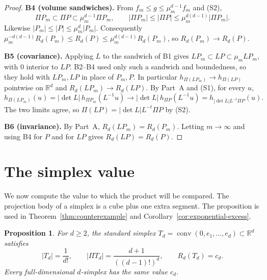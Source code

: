 \documentclass[11pt]{article}
\newtheorem{proposition}[theorem]{Proposition}
\newcommand{\R}{\mathbb R}
\DeclareMathOperator{\conv}{conv}
\newcommand{\step}[1]{\smallskip\noindent\textbf{#1}}
\begin{document}
\begin{proof}
\step{B4 (volume sandwiches).} From \(f_m\le g\le\mu_m^{d-1}f_m\) and (S2),
\[
 \Pi P_m\subset\Pi P\subset\mu_m^{d-1}\Pi P_m,
 \qquad
 |\Pi P_m|\le|\Pi P|\le\mu_m^{d(d-1)}|\Pi P_m|.
\]
Likewise \(|P_m|\le|P|\le\mu_m^d|P_m|\). Consequently
\(\mu_m^{-d(d-1)}R_d(P_m)\le R_d(P)\le\mu_m^{d(d-1)}R_d(P_m)\), so
\(R_d(P_m)\to R_d(P)\).

\step{B5 (covariance).} Applying \(L\) to the sandwich of B1 gives
\(LP_m\subset LP\subset\mu_mLP_m\), with \(0\) interior to \(LP\). B2--B4
used only such a sandwich and boundedness, so they hold with
\(LP_m,LP\) in place of \(P_m,P\). In particular
\(h_{\Pi(LP_m)}\to h_{\Pi(LP)}\) pointwise on \(\R^d\) and
\(R_d(LP_m)\to R_d(LP)\). By Part~A and (S1), for every \(u\),
\[
 h_{\Pi(LP_m)}(u)=|\det L|\,h_{\Pi P_m}(L^{-1}u)
 \longrightarrow|\det L|\,h_{\Pi P}(L^{-1}u)
 =h_{|\det L|L^{-t}\Pi P}(u).
\]
The two limits agree, so \(\Pi(LP)=|\det L|L^{-t}\Pi P\) by (S2).

\step{B6 (invariance).} By Part~A, \(R_d(LP_m)=R_d(P_m)\). Letting
\(m\to\infty\) and using B4 for \(P\) and for \(LP\) gives
\(R_d(LP)=R_d(P)\).
\end{proof}

\section{The simplex value}\label{sec:simplex}

We now compute the value to which the product will be compared. The
projection body of a simplex is a cube plus one extra segment. The
proposition is used in Theorem~\ref{thm:counterexample} and
Corollary~\ref{cor:exponential-excess}.

\begin{proposition}\label{prop:simplex}
For \(d\ge2\), the standard simplex
\(T_d=\conv(0,e_1,\ldots,e_d)\subset\R^d\) satisfies
\[
 |T_d|=\frac1{d!},\qquad
 |\Pi T_d|=\frac{d+1}{((d-1)!)^d},\qquad
 R_d(T_d)=c_d.
\]
Every full-dimensional \(d\)-simplex has the same value \(c_d\).
\end{proposition}
\end{document}
